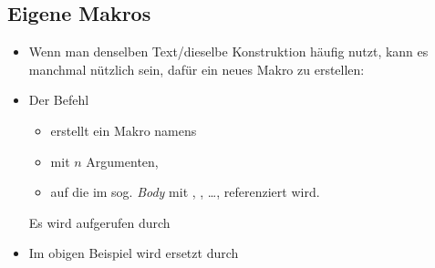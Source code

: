 \subsection{Eigene Makros}

\begin{frame}{\subsecname}
    \begin{itemize}
        \item Wenn man denselben Text/dieselbe Konstruktion häufig nutzt, kann es manchmal nützlich
            sein, dafür ein neues \alert{Makro} zu erstellen:
        \item Der Befehl 
            \begin{itemize}
                \item erstellt ein Makro namens \code{\\macro}
                \item mit $n$ Argumenten,
                \item auf die im sog. \textit{Body} mit , , \dots, 
                    referenziert wird.
            \end{itemize}
            Es wird aufgerufen durch 
        \item Im obigen Beispiel wird  ersetzt durch
            \begin{center}
            \end{center}
    \end{itemize}
\end{frame}
